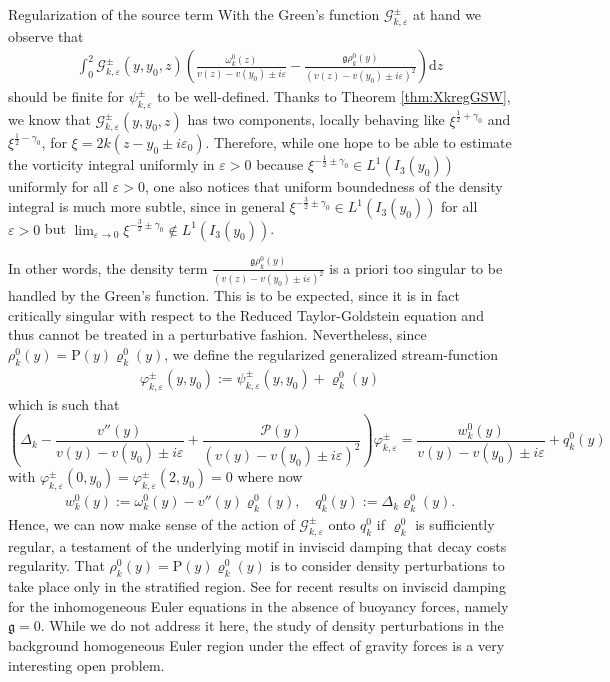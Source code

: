 \documentclass[11pt,reqno]{amsproc}
\makeatletter
\renewcommand\subsubsection{\@startsection{subsubsection}{3}%
\normalparindent{.5\linespacing\@plus.7\linespacing}{-.5em}
{\normalfont\bfseries}}
\theoremstyle{definition}
\numberwithin{equation}{section}
\newcommand{\G}{{\mathcal{G}}}
\newcommand{\D}{{\Delta}}
\renewcommand{\d}{\mathrm{d}}
\newcommand{\ep}{\varepsilon}
\newcommand{\g}{{\mathfrak{g}}}
\renewcommand{\P}{{\mathcal{P}}}
\makeatother
\begin{document}
\subsubsection{Regularization of the source term}
With the Green's function $\G_{k,\ep}^\pm$ at hand we observe that 
\begin{align*}
 \int_0^2 \G_{k,\ep}^\pm(y,y_0,z) \left( \frac{\omega_k^0(z)}{v(z) - v(y_0) \pm i\ep} - \frac{\g \rho_k^0(y)}{(v(z) - v(y_0) \pm i\ep)^2} \right) \d z
\end{align*}
should be finite for $\psi_{k,\ep}^\pm$ to be well-defined. Thanks to Theorem \ref{thm:XkregGSW}, we know that $\G_{k,\ep}^\pm(y,y_0,z)$ has two components, locally behaving like $\xi^{\frac12+\gamma_0}$ and $\xi^{\frac12-\gamma_0}$, for $\xi = 2k(z-y_0\pm i\ep_0)$. Therefore, while one hope to be able to estimate the vorticity integral uniformly in $\ep>0$ because $\xi^{-\frac12\pm \gamma_0}\in L^1(I_3(y_0))$ uniformly for all $\ep>0$, one also notices that uniform boundedness of the density integral is much more subtle, since in general $\xi^{-\frac32\pm \gamma_0}\in L^1(I_3(y_0))$ for all $\ep>0$ but $\lim_{\ep\rightarrow 0}\xi^{-\frac32\pm \gamma_0}\not  \in L^1(I_3(y_0))$. 

In other words, the density term $\frac{\g \rho_k^0(y)}{(v(z) - v(y_0) \pm i\ep)^2}$ is a priori too singular to be handled by the Green's function. This is to be expected, since it is in fact critically singular with respect to the Reduced Taylor-Goldstein equation and thus cannot be treated in a perturbative fashion. Nevertheless, since $\rho_k^0(y) = \mathrm{P}(y)\varrho_k^0(y)$, we define the regularized generalized stream-function
\begin{align}\label{eq:defvarphi}
\varphi_{k,\ep}^\pm(y,y_0) :=  {\psi}_{k,\ep}^\pm(y,y_0) + \varrho_k^0(y) 
\end{align}
which is such that
\begin{equation}\label{eq:introTGvarphi}
\left(  \D_k-\frac{v''(y)}{v(y)-v(y_0)\pm i\ep}+\frac{\P(y)}{(v(y)-v(y_0)\pm i\ep)^2}\right) {\varphi}_{k,\ep}^\pm=\frac{w_k^0(y)}{v(y)-v(y_0)\pm i\ep} + q_k^0(y)
\end{equation}
with $\varphi_{k,\ep}^\pm(0,y_0) = \varphi_{k,\ep}^\pm(2,y_0) = 0$ where now
\begin{align*}
w_k^0(y) := \omega_k^0(y) - v''(y) \varrho_k^0(y), \quad q_k^0(y) := \Delta_k \varrho_k^0(y).
\end{align*}
Hence, we can now make sense of the action of $\G_{k,\ep}^\pm$ onto $q_k^0$ if $\varrho_k^0$ is sufficiently regular, a testament of the underlying motif in inviscid damping that decay costs regularity. That $\rho_k^0(y) = \mathrm{P}(y)\varrho_k^0(y)$ is to consider density perturbations to take place only in the stratified region. See \cite{Zhao23} for recent results on inviscid damping for the inhomogeneous Euler equations in the absence of buoyancy forces, namely $\g=0$. While we do not address it here, the study of density perturbations in the background homogeneous Euler region under the effect of gravity forces is a very interesting open problem.
\end{document}
